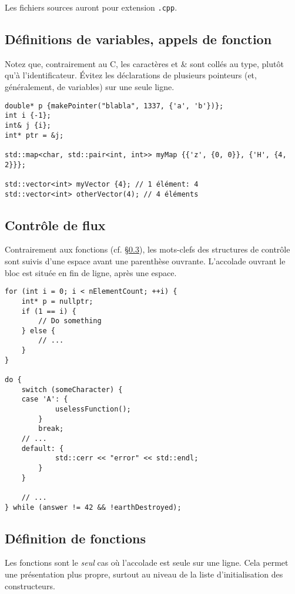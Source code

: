 \documentclass[12pt,a4paper]{article}
\begin{document}
Les fichiers sources auront pour extension \texttt{.cpp}.

\subsection{Définitions de variables, appels de fonction}
Notez que, contrairement au C, les caractères \og * \fg{} et \og \& \fg{} sont collés au type, plutôt qu'à l'identificateur. Évitez les déclarations de plusieurs pointeurs (et, généralement, de variables) sur une seule ligne.

\begin{lstlisting}[breaklines]
double* p {makePointer("blabla", 1337, {'a', 'b'})};
int i {-1};
int& j {i};
int* ptr = &j;

std::map<char, std::pair<int, int>> myMap {{'z', {0, 0}}, {'H', {4, 2}}};

std::vector<int> myVector {4}; // 1 élément: 4
std::vector<int> otherVector(4); // 4 éléments
\end{lstlisting}

\subsection{Contrôle de flux}

Contrairement aux fonctions (cf. §\ref{sec:fct}), les mots-clefs des structures de contrôle sont suivis d'une espace avant une parenthèse ouvrante. L'accolade ouvrant le bloc est située en fin de ligne, après une espace.

\begin{lstlisting}
for (int i = 0; i < nElementCount; ++i) {
	int* p = nullptr;
	if (1 == i) {
		// Do something
	} else {
		// ...
	}
}

do {
	switch (someCharacter) {
	case 'A': {
			uselessFunction();
		}
		break;
	// ...
	default: {
			std::cerr << "error" << std::endl;
		}
	}

	// ...
} while (answer != 42 && !earthDestroyed);
\end{lstlisting}

\subsection{Définition de fonctions}
\label{sec:fct}

Les fonctions sont le \emph{seul} cas où l'accolade est seule sur une ligne. Cela permet une présentation plus propre, surtout au niveau de la liste d'initialisation des constructeurs.
\end{document}
